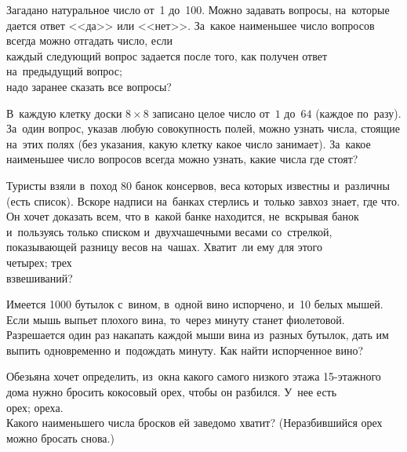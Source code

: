 


\begin{problems}

\item
Загадано натуральное число от~1 до~100.
Можно задавать вопросы, на~которые дается ответ <<да>> или <<нет>>.
За~какое наименьшее число вопросов всегда можно отгадать число, если
\\
\subproblem
каждый следующий вопрос задается после того, как получен ответ на~предыдущий
вопрос;
\\
\subproblem
надо заранее сказать все вопросы?

\item
В~каждую клетку доски $8 \times 8$ записано целое число от~$1$ до~$64$
(каждое по~разу).
За~один вопрос, указав любую совокупность полей, можно узнать числа, стоящие
на~этих полях
(без указания, какую клетку какое число занимает).
За~какое наименьшее число вопросов всегда можно узнать, какие числа где стоят?

\item
Туристы взяли в~поход $80$ банок консервов, веса которых известны и~различны
(есть список).
Вскоре надписи на~банках стерлись
и~только завхоз знает, где что.
Он хочет доказать всем, что в~какой банке находится, не~вскрывая банок
и~пользуясь только списком и~двухчашечными весами со~стрелкой, показывающей
разницу весов на~чашах.
Хватит~ли ему для этого
\\
\subproblem четырех;
\quad
\subproblem трех
\\
взвешиваний?

\item
Имеется 1000 бутылок с~вином, в~одной вино испорчено, и~10 белых мышей.
Если мышь выпьет плохого вина, то~через минуту станет фиолетовой.
Разрешается один раз накапать каждой мыши вина из~разных бутылок, дать им
выпить одновременно и~подождать минуту.
Как найти испорченное вино?

\item
Обезьяна хочет определить, из~окна какого самого низкого этажа 15-этажного дома
нужно бросить кокосовый орех, чтобы он разбился.
У~нее есть
\\
 орех;
\qquad
{} ореха.
\\
Какого наименьшего числа бросков ей заведомо хватит?
(Неразбившийся орех можно бросать снова.)


\end{problems}
